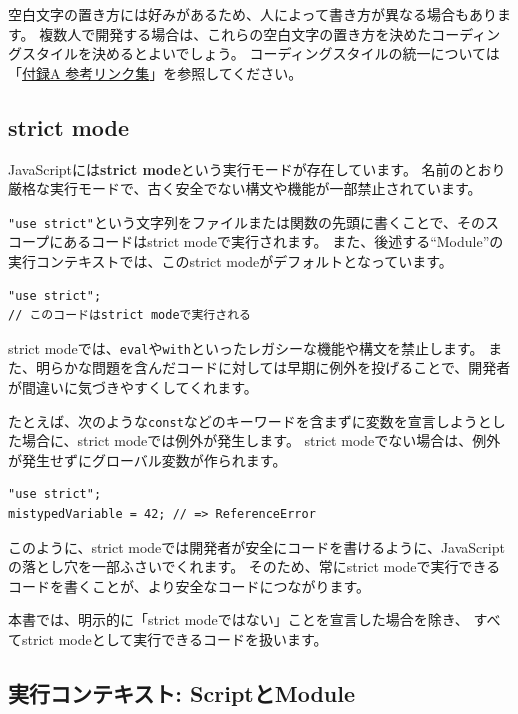空白文字の置き方には好みがあるため、人によって書き方が異なる場合もあります。
複数人で開発する場合は、これらの空白文字の置き方を決めたコーディングスタイルを決めるとよいでしょう。
コーディングスタイルの統一については「\hyperlink{reference-links}{付録A 参考リンク集}」を参照してください。

\hypertarget{strict-mode}{%
\subsection{strict mode}\label{strict-mode}}

JavaScriptには\textbf{strict mode}という実行モードが存在しています。
名前のとおり厳格な実行モードで、古く安全でない構文や機能が一部禁止されています。

\texttt{"use strict"}という文字列をファイルまたは関数の先頭に書くことで、そのスコープにあるコードはstrict
modeで実行されます。
また、後述する``Module''の実行コンテキストでは、このstrict
modeがデフォルトとなっています。

\begin{lstlisting}
"use strict";
// このコードはstrict modeで実行される
\end{lstlisting}

strict
modeでは、\texttt{eval}や\texttt{with}といったレガシーな機能や構文を禁止します。
また、明らかな問題を含んだコードに対しては早期に例外を投げることで、開発者が間違いに気づきやすくしてくれます。

たとえば、次のような\texttt{const}などのキーワードを含まずに変数を宣言しようとした場合に、strict
modeでは例外が発生します。 strict
modeでない場合は、例外が発生せずにグローバル変数が作られます。

\begin{lstlisting}
"use strict";
mistypedVariable = 42; // => ReferenceError
\end{lstlisting}

このように、strict
modeでは開発者が安全にコードを書けるように、JavaScriptの落とし穴を一部ふさいでくれます。
そのため、常にstrict
modeで実行できるコードを書くことが、より安全なコードにつながります。

本書では、明示的に「strict modeではない」ことを宣言した場合を除き、
すべてstrict modeとして実行できるコードを扱います。

\hypertarget{script-module}{%
\subsection{実行コンテキスト: ScriptとModule}\label{script-module}}

